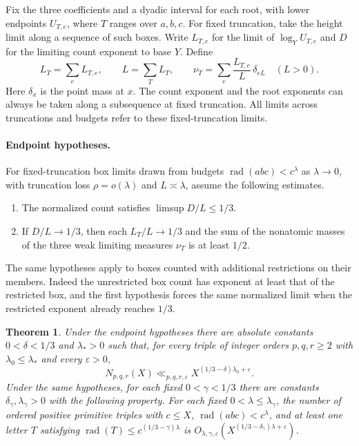 \documentclass[11pt,reqno]{amsart}
\newtheorem{theorem}{Theorem}
\DeclareMathOperator{\rad}{rad}
\newcommand{\eps}{\varepsilon}
\begin{document}
Fix the three coefficients and a dyadic interval for each root, with
lower endpoints \(U_{T,e}\), where \(T\) ranges over \(a,b,c\). For
fixed truncation, take the height limit along a sequence of such
boxes. Write \(L_{T,e}\) for the limit of \(\log_Y U_{T,e}\) and
\(D\) for the limiting count exponent to base \(Y\). Define
\[
  L_T=\sum_e L_{T,e},\qquad L=\sum_T L_T,\qquad
  \nu_T=\sum_e \frac{L_{T,e}}{L}\,\delta_{eL}\quad(L>0).
\]
Here \(\delta_x\) is the point mass at \(x\). The count exponent and
the root exponents can always be taken along a subsequence at fixed
truncation. All limits across truncations and budgets refer to these
fixed-truncation limits.

\paragraph{Endpoint hypotheses.}
For fixed-truncation box limits drawn from budgets
\(\rad(abc)<c^\lambda\) as \(\lambda\to0\), with truncation
loss \(\rho=o(\lambda)\) and \(L\asymp\lambda\), assume the
following estimates.
\begin{enumerate}
\item The normalized count satisfies \(\limsup D/L\le1/3\).
\item If \(D/L\to1/3\), then each \(L_T/L\to1/3\) and the
sum of the nonatomic masses of the three weak limiting
measures \(\nu_T\) is at least \(1/2\).
\end{enumerate}
The same hypotheses apply to boxes counted with additional
restrictions on their members. Indeed the unrestricted box count
has exponent at least that of the restricted box, and the first
hypothesis forces the same normalized limit when the restricted
exponent already reaches \(1/3\).

\begin{theorem}\label{thm:abc-endpoint-transfer}
Under the endpoint hypotheses there are absolute constants
\(0<\delta<1/3\) and \(\lambda_*>0\) such that, for every triple of integer orders
\(p,q,r\ge2\) with \(\lambda_0\le\lambda_*\) and every
\(\eps>0\),
\[
  N_{p,q,r}(X)\ll_{p,q,r,\eps}
          X^{(1/3-\delta)\lambda_0+\eps}.
\]
Under the same hypotheses, for each fixed \(0<\gamma<1/3\) there
are constants \(\delta_\gamma,\lambda_\gamma>0\) with the following
property. For each fixed \(0<\lambda\le\lambda_\gamma\), the
number of ordered positive primitive triples with \(c\le X\),
\(\rad(abc)<c^\lambda\), and at least one letter \(T\) satisfying
\(\rad(T)\le c^{(1/3-\gamma)\lambda}\) is
\(O_{\lambda,\gamma,\eps}(X^{(1/3-\delta_\gamma)\lambda+\eps})\).
\end{theorem}
\end{document}
